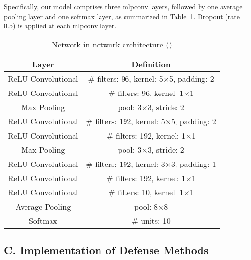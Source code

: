 Specifically, our \nin model comprises three mlpconv layers, followed by one average pooling layer and one softmax layer, as summarized in Table~\ref{tab:svhn}.
Dropout (rate = 0.5) is applied at each mlpconv layer.

\begin{table}[h]{\small
  \centering
\begin{tabular}{c|c}
{\bf Layer} & {\bf Definition} \\
\hline
ReLU Convolutional & \# filters: 96, kernel: 5$\times$5, padding: 2 \\
\hline
ReLU Convolutional &  \# filters: 96, kernel: 1$\times$1 \\
\hline
Max Pooling & pool: 3$\times$3, stride: 2\\
\hline
\hline
ReLU Convolutional & \# filters: 192, kernel: 5$\times$5, padding: 2\\
\hline
ReLU Convolutional & \# filters: 192, kernel: 1$\times$1 \\
\hline
Max Pooling & pool: 3$\times$3, stride: 2\\
\hline
\hline
ReLU Convolutional & \# filters: 192, kernel: 3$\times$3, padding: 1 \\
\hline
ReLU Convolutional & \# filters: 192, kernel: 1$\times$1 \\
\hline
ReLU Convolutional & \# filters: 10, kernel: 1$\times$1 \\
\hline
Average Pooling & pool: 8$\times$8 \\
\hline
Softmax & \# units: 10\\
\hline

\end{tabular}
\caption{Network-in-network architecture (\svhn) \label{tab:svhn} }}
\end{table}


%


\subsection*{C. Implementation of Defense Methods}


